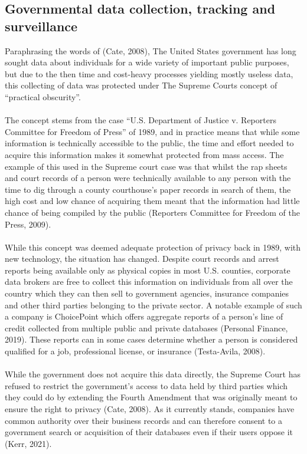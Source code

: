 \documentclass[11pt]{article}
\begin{document}
\subsection{Governmental data collection, tracking and surveillance}
Paraphrasing the words of (Cate, 2008), The United States government has long sought data about individuals for a wide variety of important public purposes, but due to the then time and cost-heavy processes yielding mostly useless data, this collecting of data was protected under The Supreme Courts concept of “practical obscurity”.  \\ \\

The concept stems from the case “U.S. Department of Justice v. Reporters Committee for Freedom of Press” of 1989, and in practice means that while some information is technically accessible to the public, the time and effort needed to acquire this information makes it somewhat protected from mass access. The example of this used in the Supreme court case was that whilst the rap sheets and court records of a person were technically available to any person with the time to dig through a county courthouse’s paper records in search of them, the high cost and low chance of acquiring them meant that the information had little chance of being compiled by the public (Reporters Committee for Freedom of the Press, 2009).  \\ \\

While this concept was deemed adequate protection of privacy back in 1989, with new technology, the situation has changed. Despite court records and arrest reports being available only as physical copies in most U.S. counties, corporate data brokers are free to collect this information on individuals from all over the country which they can then sell to government agencies, insurance companies and other third parties belonging to the private sector. A notable example of such a company is ChoicePoint which offers aggregate reports of a person’s line of credit collected from multiple public and private databases (Personal Finance, 2019). These reports can in some cases determine whether a person is considered qualified for a job, professional license, or insurance (Testa-Avila, 2008). \\ \\

While the government does not acquire this data directly, the Supreme Court has refused to restrict the government’s access to data held by third parties which they could do by extending the Fourth Amendment that was originally meant to ensure the right to privacy (Cate, 2008). As it currently stands, companies have common authority over their business records and can therefore consent to a government search or acquisition of their databases even if their users oppose it (Kerr, 2021). \\ \\
\end{document}
